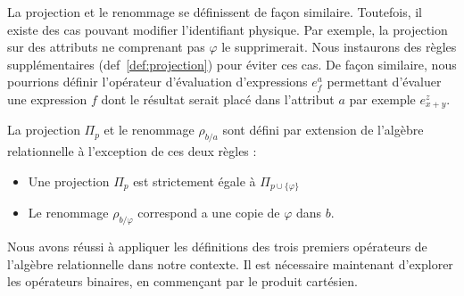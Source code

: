 La projection et le renommage se définissent de façon similaire. Toutefois, il existe des cas pouvant modifier l'identifiant physique. Par exemple, la projection sur des attributs ne comprenant pas $\varphi$ le supprimerait. Nous instaurons des règles supplémentaires (def~\ref{def:projection}) pour éviter ces cas. De façon similaire, nous pourrions définir l'opérateur d'évaluation d'expressions $e_f^a$ permettant d'évaluer une expression $f$ dont le résultat serait placé dans l'attribut $a$ par exemple $e_{x+y}^z$.
\begin{defi}\label{def:projection}
La projection $\Pi_p$ et le renommage $\rho_{b/a}$ sont défini par extension de l'algèbre relationnelle à l'exception de ces deux règles :
\begin{itemize}
\item Une projection $\Pi_p$ est strictement égale à $\Pi_{p\cup \{\varphi\}}$
\item Le renommage $\rho_{b/\varphi}$ correspond a une copie de $\varphi$ dans $b$.
\end{itemize}
\end{defi}

Nous avons réussi à appliquer les définitions des trois premiers opérateurs de l'algèbre relationnelle dans notre contexte. Il est nécessaire maintenant d'explorer les opérateurs binaires, en commençant par le produit cartésien.

